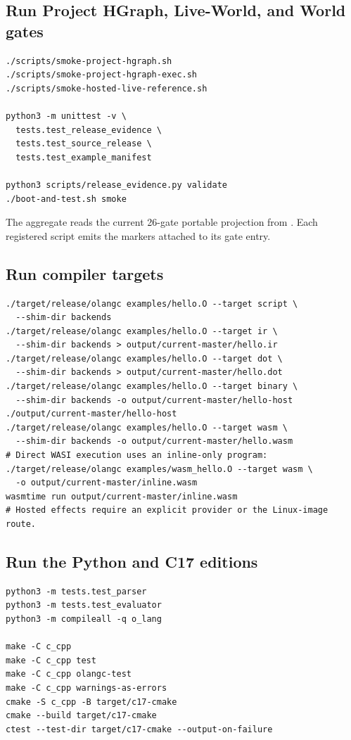 \documentclass[11pt,oneside]{article}
\begin{document}
\subsection{Run Project HGraph, Live-World, and World gates}

\begin{lstlisting}[style=plaincode]
./scripts/smoke-project-hgraph.sh
./scripts/smoke-project-hgraph-exec.sh
./scripts/smoke-hosted-live-reference.sh

python3 -m unittest -v \
  tests.test_release_evidence \
  tests.test_source_release \
  tests.test_example_manifest

python3 scripts/release_evidence.py validate
./boot-and-test.sh smoke
\end{lstlisting}

The aggregate reads the current 26-gate portable projection from
. Each registered script emits the markers attached
to its gate entry.

\subsection{Run compiler targets}

\begin{lstlisting}[style=plaincode]
./target/release/olangc examples/hello.O --target script \
  --shim-dir backends
./target/release/olangc examples/hello.O --target ir \
  --shim-dir backends > output/current-master/hello.ir
./target/release/olangc examples/hello.O --target dot \
  --shim-dir backends > output/current-master/hello.dot
./target/release/olangc examples/hello.O --target binary \
  --shim-dir backends -o output/current-master/hello-host
./output/current-master/hello-host
./target/release/olangc examples/hello.O --target wasm \
  --shim-dir backends -o output/current-master/hello.wasm
# Direct WASI execution uses an inline-only program:
./target/release/olangc examples/wasm_hello.O --target wasm \
  -o output/current-master/inline.wasm
wasmtime run output/current-master/inline.wasm
# Hosted effects require an explicit provider or the Linux-image route.
\end{lstlisting}

\subsection{Run the Python and C17 editions}

\begin{lstlisting}[style=plaincode]
python3 -m tests.test_parser
python3 -m tests.test_evaluator
python3 -m compileall -q o_lang

make -C c_cpp
make -C c_cpp test
make -C c_cpp olangc-test
make -C c_cpp warnings-as-errors
cmake -S c_cpp -B target/c17-cmake
cmake --build target/c17-cmake
ctest --test-dir target/c17-cmake --output-on-failure
\end{lstlisting}
\end{document}
